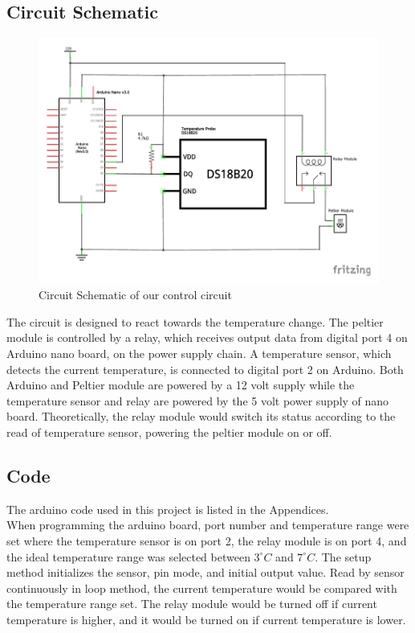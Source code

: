 \documentclass[12pt,onecolumn]{article}
\begin{document}
\subsection{Circuit Schematic}
\begin{figure}[H]
	\centering
	\includegraphics[scale=1.0]{mini_fridge_schem}
	\caption{Circuit Schematic of our control circuit}
\end{figure}
The circuit is designed to react towards the temperature change. The peltier module is controlled by a relay, which receives output data from digital port 4 on Arduino nano board, on the power supply chain. A temperature sensor, which detects the current temperature, is connected to digital port 2 on Arduino. Both Arduino and Peltier module are powered by a 12 volt supply while the temperature sensor and relay are powered by the 5 volt power supply of nano board. Theoretically, the relay module would switch its status according to the read of temperature sensor, powering the peltier module on or off. 

\subsection{Code}
The arduino code used in this project is listed in the Appendices.\\
When programming the arduino board, port number and temperature range were set where the temperature sensor is on port 2, the relay module is on port 4, and the ideal temperature range was selected between $3^{\circ}C$ and $7^{\circ}C$. The setup method initializes the sensor, pin mode, and initial output value. Read by sensor continuously in loop method, the current temperature would be compared with the temperature range set. The relay module would be turned off if current temperature is higher, and it would be turned on if current temperature is lower.
\end{document}
